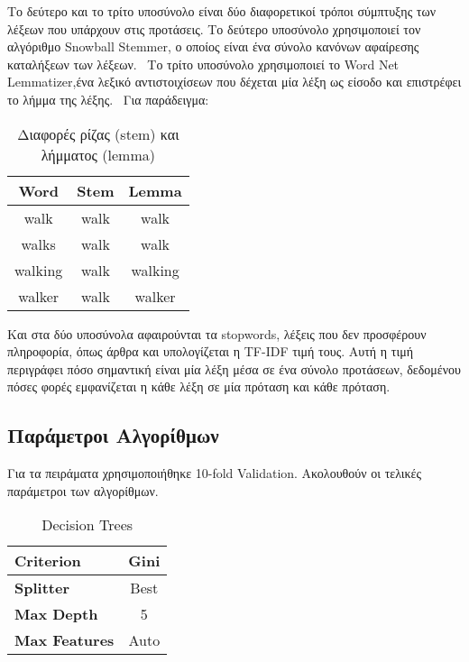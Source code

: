 \documentclass[a4paper, 12pt]{article}
\begin{document}
Το δεύτερο και το τρίτο υποσύνολο είναι δύο διαφορετικοί τρόποι σύμπτυξης των λέξεων που υπάρχουν στις προτάσεις. Το δεύτερο υποσύνολο χρησιμοποιεί τον αλγόριθμο Snowball Stemmer,  ο οποίος είναι ένα σύνολο κανόνων αφαίρεσης καταλήξεων των λέξεων.~\cite{porter-2001}
Το τρίτο υποσύνολο χρησιμοποιεί το Word Net Lemmatizer,ένα λεξικό αντιστοιχίσεων που δέχεται μία λέξη ως είσοδο και επιστρέφει το λήμμα της λέξης.~\cite{nltk-wordnet} Για παράδειγμα:
\begin{table}[h!]
  \caption{Διαφορές ρίζας (stem) και λήμματος (lemma)}
  \begin{center}
	\begin{tabular}{c c c}
	  \hline
	  \textbf{Word} & \textbf{Stem} & \textbf{Lemma} \\
	  \hline
	  walk          & walk          & walk           \\
	  \hline
	  walks         & walk          & walk           \\
	  \hline
	  walking       & walk          & walking        \\
	  \hline
	  walker        & walk          & walker         \\
	  \hline
	\end{tabular}
  \end{center}
\end{table}

Και στα δύο υποσύνολα αφαιρούνται τα stopwords, λέξεις που δεν προσφέρουν πληροφορία, όπως άρθρα και υπολογίζεται η TF-IDF τιμή τους. Αυτή η τιμή περιγράφει πόσο σημαντική είναι μία λέξη μέσα σε ένα σύνολο προτάσεων, δεδομένου πόσες φορές εμφανίζεται η κάθε λέξη σε μία πρόταση και κάθε πρόταση.~\cite{leskovec-2020}

\subsection{Παράμετροι Αλγορίθμων}

Για τα πειράματα χρησιμοποιήθηκε 10-fold Validation. Ακολουθούν οι τελικές παράμετροι των αλγορίθμων.

\begin{table}[h!]
  \caption{Decision Trees}
  \begin{center}
	\begin{tabular}{l c}
	  \hline
	  \textbf{Criterion} & Gini \\
	  \hline
	  \textbf{Splitter}  & Best \\
	  \hline
	  \textbf{Max Depth} & 5 \\
	  \hline
	  \textbf{Max Features} & Auto \\
	  \hline
	\end{tabular}
  \end{center}
\end{table}
\end{document}
